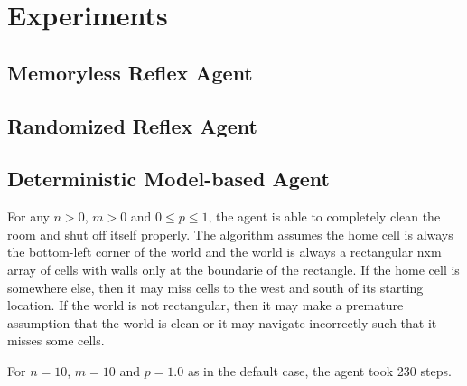 \section{Experiments}

\subsection{Memoryless Reflex Agent}

\subsection{Randomized Reflex Agent}

\subsection{Deterministic Model-based Agent}

For any $n>0$, $m>0$ and $0\le p \le1$, the agent is able to completely clean the room and shut off itself properly. The algorithm assumes the home cell is always the bottom-left corner of the world and the world is always a rectangular nxm array of cells with walls only at the boundarie of the rectangle. If the home cell is somewhere else, then it may miss cells to the west and south of its starting location. If the world is not rectangular, then it may make a premature assumption that the world is clean or it may navigate incorrectly such that it misses some cells.

For $n=10$, $m=10$ and $p=1.0$ as in the default case, the agent took 230 steps.

